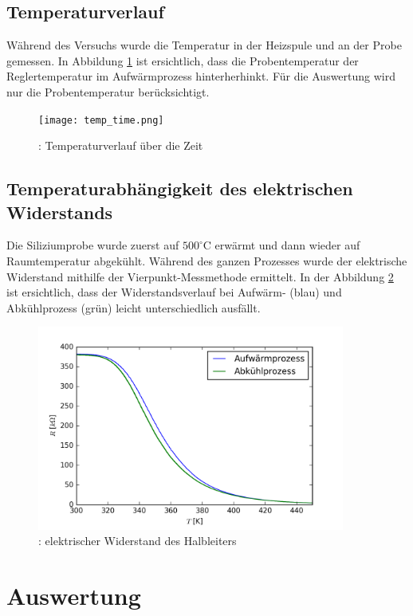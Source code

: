 \documentclass[a4paper,parskip,11pt, DIV12]{scrreprt}
\begin{document}
\section{Temperaturverlauf}
Während des Versuchs wurde die Temperatur in der Heizspule und an der Probe gemessen. In Abbildung \ref{temp_time} ist ersichtlich, dass die Probentemperatur der Reglertemperatur im Aufwärmprozess hinterherhinkt. Für die Auswertung wird nur die Probentemperatur berücksichtigt.
%
\begin{figure}[htbp]
\centering
\texttt{[image: temp\_time.png]}
\caption{: Temperaturverlauf über die Zeit}
\label{temp_time}
\end{figure}
%

\clearpage

\section{Temperaturabhängigkeit des elektrischen Widerstands}
Die Siliziumprobe wurde zuerst auf $500^{\circ}$C erwärmt und dann wieder auf Raumtemperatur abgekühlt. Während des ganzen Prozesses wurde der elektrische Widerstand mithilfe der Vierpunkt-Messmethode ermittelt. In der Abbildung \ref{res_temp} ist ersichtlich, dass der Widerstandsverlauf bei Aufwärm- (blau) und Abkühlprozess (grün) leicht unterschiedlich ausfällt.
%
\begin{figure}[htbp]
\centering
\includegraphics[width=0.9\textwidth]{res_temp.png}
\caption{: elektrischer Widerstand des Halbleiters}
\label{res_temp}
\end{figure}
%


\chapter{Auswertung}
\end{document}
